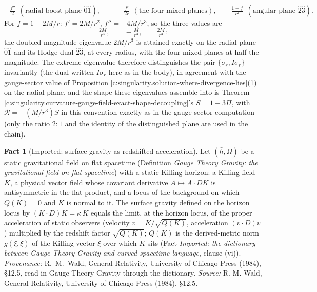 \documentclass[11pt]{article}
\theoremstyle{definition}
\newtheorem{fact}[theorem]{Fact}
\theoremstyle{plain}
\newcommand{\changedmark}[2]{\marginpar{\raggedright\scriptsize\color{#1}#2}}
\providecommand{\hb}{}\renewcommand{\hb}{\bar{h}}
\begin{document}
\[
-\tfrac{f''}{2} \ \ (\text{radial boost plane } \hat 0\hat 1), \qquad
-\tfrac{f'}{2r} \ \ (\text{the four mixed planes}), \qquad
\tfrac{1-f}{r^2} \ \ (\text{angular plane } \hat 2\hat 3).
\]
For $f = 1 - 2M/r$: $f' = 2M/r^2$, $f'' = -4M/r^3$, so the three values are
\[
\tfrac{2M}{r^3}, \qquad -\tfrac{M}{r^3}, \qquad \tfrac{2M}{r^3} :
\]
the doubled-magnitude eigenvalue $2M/r^3$ is attained exactly on the radial plane $\hat 0\hat 1$ and its Hodge dual $\hat 2\hat 3$, at every radius, with the four mixed planes at half the magnitude. The extreme eigenvalue therefore distinguishes the pair $\{\sigma_r, I\sigma_r\}$ invariantly (the dual written $I\sigma_r$ here as in the body), in agreement with the gauge-sector value of Proposition \ref{c:singularity.solution-where-divergence-lies}(1) on the radial plane, and the shape these eigenvalues assemble into is Theorem \ref{c:singularity.curvature-gauge-field-exact-shape-decoupling}'s $S = 1 - 3\Pi$, with $\mathcal{R} = -(M/r^{3})S$ in this convention exactly as in the gauge-sector computation (only the ratio $2 : 1$ and the identity of the distinguished plane are used in the chain).

\begin{fact}[Imported: surface gravity as redshifted acceleration]\label{c:singularity.imported-surface-gravity-redshifted-acceleration}
\changedmark{gray}{reworded}
Let $(\hb, \Omega)$ be a static gravitational field on flat spacetime (Definition \emph{Gauge Theory Gravity: the gravitational field on flat spacetime}) with a static Killing horizon: a Killing field $K$, a physical vector field whose covariant derivative $A \mapsto A \cdot D K$ is antisymmetric in the flat product, and a locus of the background on which $Q(K) = 0$ and $K$ is normal to it. The surface gravity defined on the horizon locus by $(K \cdot D)K = \kappa\,K$ equals the limit, at the horizon locus, of the proper acceleration of static observers (velocity $v = K/\sqrt{Q(K)}$, acceleration $(v \cdot D)v$) multiplied by the redshift factor $\sqrt{Q(K)}$; $Q(K)$ is the derived-metric norm $g(\xi,\xi)$ of the Killing vector $\xi$ over which $K$ sits (Fact \emph{Imported: the dictionary between Gauge Theory Gravity and curved-spacetime language}, clause (vi)). \emph{Provenance:} R.~M.~Wald, General Relativity, University of Chicago Press (1984), \S 12.5, read in Gauge Theory Gravity through the dictionary.
\emph{Source:} R. M. Wald, General Relativity, University of Chicago Press (1984), §12.5.
\end{fact}
\end{document}
